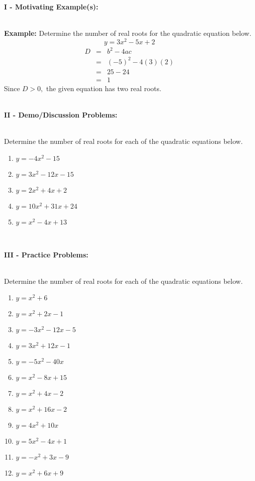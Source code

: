 \documentclass[12pt]{article}
\theoremstyle{definition}
\begin{document}
{\bf I - Motivating Example(s):}\\
\ \par
{\bf Example:}  Determine the number of real roots for the quadratic equation below.
$$y=3x^2-5x+2$$
\begin{eqnarray*}
D & = & b^2-4ac\\
  & = & (-5)^2-4(3)(2)\\
	& = & 25-24\\
	& = & 1
\end{eqnarray*}
Since $D>0,$ the given equation has two real roots.\\
\ \par
{\bf II - Demo/Discussion Problems:}\\
\ \par
Determine the number of real roots for each of the quadratic equations below.
\begin{enumerate}
	\item $y=-4x^2-15$
	\item $y=3x^2-12x-15$
	\item $y=2x^2+4x+2$
	\item $y=10x^2+31x+24$
	\item $y=x^2-4x+13$
\end{enumerate}
\ \par
{\bf III - Practice Problems:}\\
\ \par
Determine the number of real roots for each of the quadratic equations below.
\begin{multicols}{3}
\begin{enumerate}
  \item $y=x^2+6$
  \item $y=x^2+2x-1$
	\item $y=-3x^2-12x-5$
  \item $y=3x^2+12x-1$
  \item $y=-5x^2-40x$
  \item $y=x^2-8x+15$
  \item $y=x^2+4x-2$
  \item $y=x^2+16x-2$
  \item $y=4x^2+10x$
	\item $y=5x^2-4x+1$
	\item $y=-x^2+3x-9$
	\item $y=x^2+6x+9$
\end{enumerate}
\end{multicols}
\newpage
\end{document}
